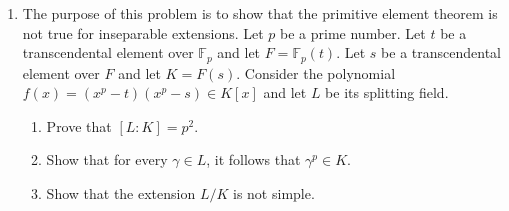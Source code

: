 \documentclass[12pt,
psamsfonts]{amsart}
\theoremstyle{remark}
\theoremstyle{definition}
\newcommand{\N}{\mathbb{N}\xspace}
\newcommand{\R}{\mathbb{R}\xspace}
\newcommand{\Q}{\mathbb{Q}\xspace}
\newcommand{\F}{\mathbb{F}\xspace}
\DeclareMathOperator{\Aut}{Aut}
\numberwithin{equation}{section}
\begin{document}
\begin{enumerate}
\begin{enumerate}
\end{enumerate} 
\medskip
\medskip 
\item The purpose of this problem is to show that the primitive element theorem is not true for inseparable extensions. Let $p$ be a prime number. Let $t$ be a transcendental element over $\F_p$ and let $F=\F_p(t)$. Let $s$ be a transcendental element over $F$ and let $K=F(s)$. Consider the polynomial $f(x)=(x^p-t)(x^p-s)\in K[x]$ and let $L$ be its splitting field. 
\begin{enumerate}
\item Prove that $[L:K]=p^2$. 
\item Show that for every $\gamma\in L$, it follows that $\gamma^p\in K$.
\item Show that the extension $L/K$ is not simple.  
\end{enumerate}
\medskip

\end{enumerate}
\end{document}
